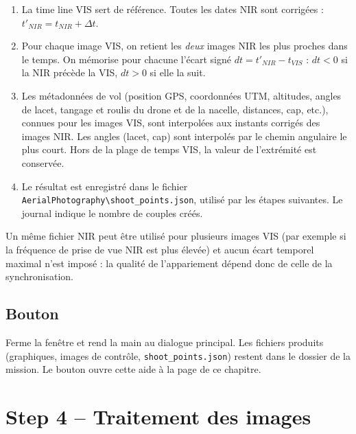 \documentclass[a4paper,11pt]{report}
\DeclareRobustCommand{\bouton}[1]{\texorpdfstring{\fbox{\small\textsf{#1}}}{#1}}
\begin{document}
\begin{enumerate}
  \item La time line VIS sert de référence. Toutes les dates NIR sont corrigées : $t'_{NIR} = t_{NIR} + \Delta t$.
  \item Pour chaque image VIS, on retient les \emph{deux} images NIR les plus proches dans le temps. On mémorise pour chacune l'écart signé $dt = t'_{NIR} - t_{VIS}$ : $dt<0$ si la NIR précède la VIS, $dt>0$ si elle la suit.
  \item Les métadonnées de vol (position GPS, coordonnées UTM, altitudes, angles de lacet, tangage et roulis du drone et de la nacelle, distances, cap, etc.), connues pour les images VIS, sont interpolées aux instants corrigés des images NIR. Les angles (lacet, cap) sont interpolés par le chemin angulaire le plus court. Hors de la plage de temps VIS, la valeur de l'extrémité est conservée.
  \item Le résultat est enregistré dans le fichier \texttt{AerialPhotography\textbackslash shoot\_points.json}, utilisé par les étapes suivantes. Le journal indique le nombre de couples créés.
\end{enumerate}
Un même fichier NIR peut être utilisé pour plusieurs images VIS (par exemple si la fréquence de prise de vue NIR est plus élevée) et aucun écart temporel maximal n'est imposé : la qualité de l'appariement dépend donc de celle de la synchronisation.

\section{Bouton \bouton{Close}}\label{btn:step3_close}
Ferme la fenêtre et rend la main au dialogue principal. Les fichiers produits (graphiques, images de contrôle, \texttt{shoot\_points.json}) restent dans le dossier de la mission. Le bouton \bouton{?} ouvre cette aide à la page de ce chapitre.

\chapter{Step 4 -- Traitement des images}\label{ch:step4}
\end{document}

